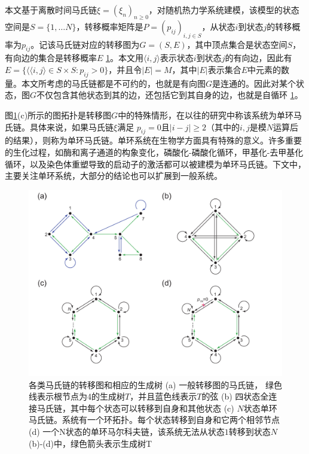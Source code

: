 
本文基于离散时间马氏链$\xi = (\xi_n)_{n \ge 0}$，对随机热力学系统建模，该模型的状态空间是$S = \{1, \dots N\}$，转移概率矩阵是$P=(p_{ij})_{i,j \in S}$，从状态$i$到状态$j$的转移概率为$p_{ij}$。记该马氏链对应的转移图为$G=(S, E)$，其中顶点集合是状态空间$S$，有向边的集合是转移概率$E$ \ref{figure:transitiongraph}。本文用$\langle i, j\rangle$表示状态$i$到状态$j$的有向边，因此有$E = \{\langle \langle i, j\rangle \in S \times S: p_{ij}>0\}$，并且令$|E| = M$，其中$|E|$表示集合$E$中元素的数量。本文所考虑的马氏链都是不可约的，也就是有向图$G$是连通的。因此对某个状态，图$G$不仅包含其他状态到其的边，还包括它到其自身的边，也就是自循环 \ref{figure:transitiongraph}。

图\ref{figure:transitiongraph}(c)所示的图拓扑是转移图$G$中的特殊情形，在以往的研究中称该系统为单环马氏链。具体来说，如果马氏链$\xi$满足 $p_{ij}=0$且$|i-j| \ge 2$（其中的$i,j$是模$N$运算后的结果），则称为单环马氏链。单环系统在生物学方面具有特殊的意义。许多重要的生化过程，如酶和离子通道的构象变化\cite{cornish2013fundamentals,sakmann2013single}，磷酸化-磷酸化循环\cite{beard2008chemical}，甲基化-去甲基化循环\cite{jia2017nonequilibrium}，以及染色体重塑导致的启动子的激活\cite{pedraza2008effects,jia2022analytical}都可以被建模为单环马氏链。下文中，主要关注单环系统，大部分的结论也可以扩展到一般系统。

\begin{figure}[h]\label{figure:transitiongraph}
\centering
\includegraphics[scale=0.5]{chart/transitiongraph.pdf}
\caption{各类马氏链的转移图和相应的生成树 (a) 一般转移图的马氏链， 绿色线表示根节点为4的生成树$T$，并且蓝色线表示$T$的弦 (b) 四状态全连接马氏链，其中每个状态可以转移到自身和其他状态 (c) 
$N$状态单环马氏链。系统有一个环拓扑。每个状态转移到自身和它两个相邻节点 (d) 一个N状态的单环马尔科夫链，该系统无法从状态$1$转移到状态$N$ (b)-(d)中，绿色箭头表示生成树T}
\end{figure}

